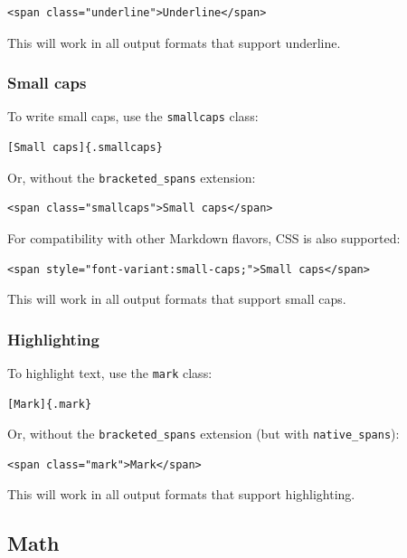 \documentclass[
]{article}
\begin{document}
\begin{verbatim}
<span class="underline">Underline</span>
\end{verbatim}

This will work in all output formats that support underline.

\hypertarget{small-caps}{%
\subsubsection{Small caps}\label{small-caps}}

To write small caps, use the \texttt{smallcaps} class:

\begin{verbatim}
[Small caps]{.smallcaps}
\end{verbatim}

Or, without the \texttt{bracketed\_spans} extension:

\begin{verbatim}
<span class="smallcaps">Small caps</span>
\end{verbatim}

For compatibility with other Markdown flavors, CSS is also supported:

\begin{verbatim}
<span style="font-variant:small-caps;">Small caps</span>
\end{verbatim}

This will work in all output formats that support small caps.

\hypertarget{highlighting}{%
\subsubsection{Highlighting}\label{highlighting}}

To highlight text, use the \texttt{mark} class:

\begin{verbatim}
[Mark]{.mark}
\end{verbatim}

Or, without the \texttt{bracketed\_spans} extension (but with
\texttt{native\_spans}):

\begin{verbatim}
<span class="mark">Mark</span>
\end{verbatim}

This will work in all output formats that support highlighting.

\hypertarget{math}{%
\subsection{Math}\label{math}}
\end{document}
